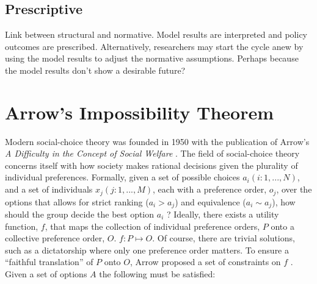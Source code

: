 \subsection{Prescriptive}
Link between structural and normative. Model results are interpreted and policy
outcomes are prescribed. Alternatively, researchers may start the cycle anew by
using the model results to adjust the normative assumptions. Perhaps because the
model results don't show a desirable future?

\section{Arrow's Impossibility Theorem}
\label{section:arrows-thm}

Modern social-choice theory was founded in 1950 with the publication of Arrow's
\textit{A Difficulty in the Concept of Social Welfare}
\cite{arrow_difficulty_1950}. The field of social-choice theory concerns itself
with how society makes rational decisions given the plurality of individual
preferences. Formally, given a set of possible choices $a_i (i: 1,..., N)$, and
a set of individuals $x_j (j:1, ...,M)$, each with a preference order, $o_j$,
over the options that allows for strict ranking ($a_i > a_j$) and equivalence
($a_i \sim a_j$), how should the group decide the best option $a_i$
\cite{franssen_arrows_2005}? Ideally, there exists a utility function, $f$, that
maps the collection of individual preference orders, $P$ onto a collective
preference order, $O$. $f: P \mapsto O$. Of course, there are trivial solutions,
such as a dictatorship where only one preference order matters. To ensure a
``faithful translation'' of $P$ onto $O$, Arrow proposed a set of constraints on
$f$ \cite{arrow_difficulty_1950,franssen_arrows_2005}. Given a set of options
$A$ the following must be satisfied:
